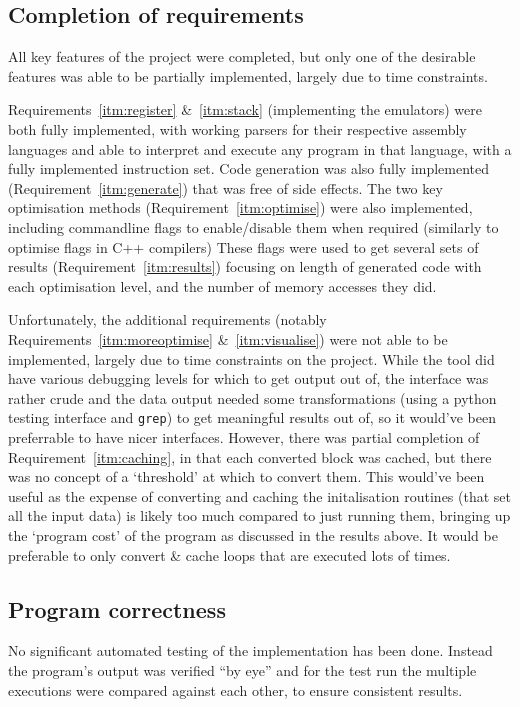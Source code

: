 \subsection{Completion of requirements}
All key features of the project were completed, but only one of the desirable
features was able to be partially implemented, largely due to time constraints.

Requirements~\ref{itm:register} \&~\ref{itm:stack} (implementing the emulators)
were both fully implemented, with working parsers for their respective assembly
languages and able to interpret and execute any program in that language, with a
fully implemented instruction set.
Code generation was also fully implemented (Requirement~\ref{itm:generate}) that
was free of side effects.
The two key optimisation methods (Requirement~\ref{itm:optimise}) were
also implemented, including commandline flags to enable/disable them when
required (similarly to optimise flags in C++ compilers)
These flags were used to get several sets of results
(Requirement~\ref{itm:results}) focusing on length of generated code with each
optimisation level, and the number of memory accesses they did.

Unfortunately, the additional requirements (notably
Requirements~\ref{itm:moreoptimise} \&~\ref{itm:visualise}) were not able to be
implemented, largely due to time constraints on the project. While the tool did
have various debugging levels for which to get output out of, the interface was
rather crude and the data output needed some transformations (using a python
testing interface and \texttt{grep}) to get meaningful results out of, so it
would've been preferrable to have nicer interfaces. However, there was partial
completion of Requirement~\ref{itm:caching}, in that each converted block was
cached, but there was no concept of a `threshold' at which to convert them. This
would've been useful as the expense of converting and caching the initalisation
routines (that set all the input data) is likely too much compared to just
running them, bringing up the `program cost' of the program as discussed in the
results above. It would be preferable to only convert \& cache loops that are
executed lots of times.

\subsection{Program correctness}
No significant automated testing of the implementation has been done. Instead
the program's output was verified ``by eye'' and for the test run the multiple
executions were compared against each other, to ensure consistent results.


